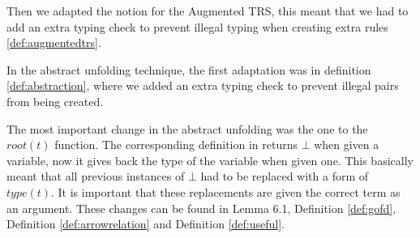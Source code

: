 Then we adapted the notion for the Augmented TRS, this meant that we had to add an extra typing check to prevent illegal typing when creating extra rules \ref{def:augmentedtrs}.

In the abstract unfolding technique, the first adaptation was in definition \ref{def:abstraction}, where we added an extra typing check to prevent illegal pairs from being created. 

The most important change in the abstract unfolding was the one to the $\textit{root}(t)$ function. The corresponding definition in \cite{Payet:Unfolding} returns $\bot$ when given a variable, now it gives back the type of the variable when given one. This basically meant that all previous instances of $\bot$ had to be replaced with a form of $\textit{type}(t)$. It is important that these replacements are given the correct term as an argument. These changes can be found in Lemma 6.1, Definition \ref{def:gofd}, Definition \ref{def:arrowrelation} and Definition \ref{def:useful}.
